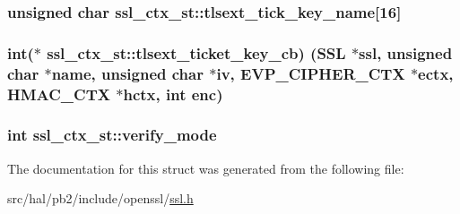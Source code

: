 \subsubsection[{\texorpdfstring{tlsext\+\_\+tick\+\_\+key\+\_\+name}{tlsext_tick_key_name}}]{\setlength{\rightskip}{0pt plus 5cm}unsigned char ssl\+\_\+ctx\+\_\+st\+::tlsext\+\_\+tick\+\_\+key\+\_\+name\mbox{[}16\mbox{]}}\hypertarget{structssl__ctx__st_a7f5cf468448dbbe1ae706c152d4abee5}{}\label{structssl__ctx__st_a7f5cf468448dbbe1ae706c152d4abee5}
\subsubsection[{\texorpdfstring{tlsext\+\_\+ticket\+\_\+key\+\_\+cb}{tlsext_ticket_key_cb}}]{\setlength{\rightskip}{0pt plus 5cm}int($\ast$ ssl\+\_\+ctx\+\_\+st\+::tlsext\+\_\+ticket\+\_\+key\+\_\+cb) ({\bf S\+SL} $\ast$ssl, unsigned char $\ast$name, unsigned char $\ast$iv, {\bf E\+V\+P\+\_\+\+C\+I\+P\+H\+E\+R\+\_\+\+C\+TX} $\ast$ectx, {\bf H\+M\+A\+C\+\_\+\+C\+TX} $\ast$hctx, int enc)}\hypertarget{structssl__ctx__st_a87b05e20d2f45baa5f9a6ea0cd2d08c5}{}\label{structssl__ctx__st_a87b05e20d2f45baa5f9a6ea0cd2d08c5}
\subsubsection[{\texorpdfstring{verify\+\_\+mode}{verify_mode}}]{\setlength{\rightskip}{0pt plus 5cm}int ssl\+\_\+ctx\+\_\+st\+::verify\+\_\+mode}\hypertarget{structssl__ctx__st_a31f82e30439244c12f51daff24fd40d8}{}\label{structssl__ctx__st_a31f82e30439244c12f51daff24fd40d8}


The documentation for this struct was generated from the following file\+:\begin{DoxyCompactItemize}
\item 
src/hal/pb2/include/openssl/\hyperlink{ssl_8h}{ssl.\+h}\end{DoxyCompactItemize}
